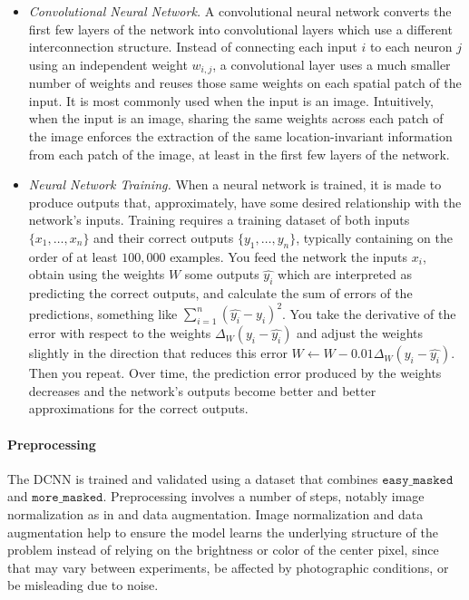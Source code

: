 \documentclass[10pt,letterpaper]{article}
\begin{document}
\begin{itemize}
                \item
                    \textit{Convolutional Neural Network.} A convolutional neural network converts the first few layers of the network into convolutional layers which use a different interconnection structure. Instead of connecting each input $i$ to each neuron $j$ using an independent weight $w_{i,j}$, a convolutional layer uses a much smaller number of weights and reuses those same weights on each spatial patch of the input. It is most commonly used when the input is an image. Intuitively, when the input is an image, sharing the same weights across each patch of the image enforces the extraction of the same location-invariant information from each patch of the image, at least in the first few layers of the network.
                
                \item
                    \textit{Neural Network Training.} When a neural network is trained, it is made to produce outputs that, approximately, have some desired relationship with the network's inputs. Training requires a training dataset of both inputs $\{x_1, \ldots, x_n\}$ and their correct outputs $\{y_1, \ldots, y_n\}$, typically containing on the order of at least $100,000$ examples. You feed the network the inputs $x_i$, obtain using the weights $W$ some outputs $\hat{y_i}$ which are interpreted as predicting the correct outputs, and calculate the sum of errors of the predictions, something like $\sum_{i = 1}^n (\hat{y_i} - y_i)^2$. You take the derivative of the error with respect to the weights $\Delta_W (y_i - \hat{y_i})$ and adjust the weights slightly in the direction that reduces this error $W \gets W - 0.01\Delta_W (y_i - \hat{y_i})$. Then you repeat. Over time, the prediction error produced by the weights decreases and the network's outputs become better and better approximations for the correct outputs.
            \end{itemize}

        \paragraph*{Preprocessing}
            The DCNN is trained and validated using a dataset that combines $\texttt{easy\_masked}$ and $\texttt{more\_masked}$. Preprocessing involves a number of steps, notably image normalization as in \cite{Valen} and data augmentation. Image normalization and data augmentation help to ensure the model learns the underlying structure of the problem instead of relying on the brightness or color of the center pixel, since that may vary between experiments, be affected by photographic conditions, or be misleading due to noise.
    
\end{document}
